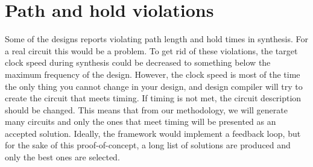 \section{Path and hold violations}
Some of the designs reports violating path length and hold times in synthesis. For a real circuit this would be a problem. To get rid of these violations, the target clock speed during synthesis could be decreased to something below the maximum frequency of the design. However, the clock speed is most of the time the only thing you cannot change in your design, and design compiler will try to create the circuit that meets timing. If timing is not met, the circuit description should be changed. This means that from our methodology, we will generate many circuits and only the ones that meet timing will be presented as an accepted solution. Ideally, the framework would implement a feedback loop, but for the sake of this proof-of-concept, a long list of solutions are produced and only the best ones are selected.
